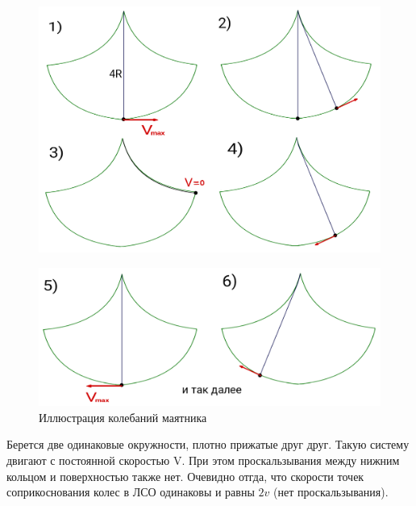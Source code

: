 \documentclass[a4paper, 10pt, twocolumn]{article}
\begin{document}
     \begin{figure}[H]
        \centering
        \includegraphics[width=1\linewidth]{kolebania1.png}
    \end{figure}
    \begin{figure}[H]
        \centering
        \includegraphics[width=1\linewidth]{kolebania2.png}
        \caption{Иллюстрация колебаний маятника}
    \end{figure}
    Берется две одинаковые окружности, плотно прижатые друг друг. Такую систему двигают с постоянной скоростью
     V. При этом проскальзывания между нижним кольцом и поверхностью также нет. Очевидно отгда, что скорости точек соприкоснования колес в 
    ЛСО одинаковы и равны $2v$ (нет проскальзывания).
\end{document}
